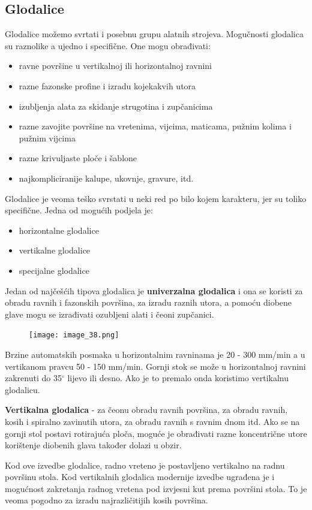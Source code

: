 \documentclass[a4paper,12pt]{article}
\numberwithin{figure}{section}
\begin{document}
\subsection{Glodalice}
Glodalice možemo svrtati i posebnu grupu alatnih strojeva. Mogučnosti glodalica su raznolike a ujedno i specifične. One mogu obrađivati:
\begin{itemize}
\item ravne površine u vertikalnoj ili horizontalnoj ravnini
\item razne fazonske profine i izradu kojekakvih utora
\item izubljenja alata za skidanje strugotina i zupčanicima
\item razne zavojite površine na vretenima, vijcima, maticama, pužnim kolima i pužnim vijcima
\item razne krivuljaste ploče i šablone
\item najkompliciranije kalupe, ukovnje, gravure, itd.
\end{itemize}
Glodalice je veoma teško svrstati u neki red po bilo kojem karakteru, jer su toliko specifične. Jedna od mogućih podjela je:
\begin{itemize}
\item horizontalne glodalice
\item vertikalne glodalice
\item specijalne glodalice
\end{itemize}
Jedan od najčešćih tipova glodalica je \textbf{univerzalna glodalica} i ona se koristi za obradu ravnih i fazonskih površina, za izradu raznih utora, a pomoću diobene glave mogu se izrađivati ozubljeni alati i čeoni zupčanici.
\begin{figure}[!h]
\centering
\texttt{[image: image\_38.png]}
\end{figure}
\FloatBarrier
Brzine automatskih posmaka u horizontalnim ravninama je 20 - 300 mm/min a u vertikanom pravcu 50 - 150 mm/min. Gornji stok se može u horizontalnoj ravnini zakrenuti do 35$^{\circ}$ lijevo ili desno. Ako je to premalo onda koristimo vertikalnu glodalicu.\par
\textbf{Vertikalna glodalica} - za čeonu obradu ravnih površina, za obradu ravnih, kosih i spiralno zavinutih utora, za obradu ravnih s ravnim dnom itd. Ako se na gornji stol postavi rotirajuća ploča, moguće je obrađivati razne koncentrične utore korištenje diobenih glava također dolazi u obzir.\par
Kod ove izvedbe glodalice, radno vreteno je postavljeno vertikalno na radnu površinu stola. Kod vertikalnih glodalica modernije izvedbe ugrađena je i mogućnost zakretanja radnog vretena pod izvjesni kut prema površini stola. To je veoma pogodno za izradu najrazličitijih kosih površina.\par
\end{document}
